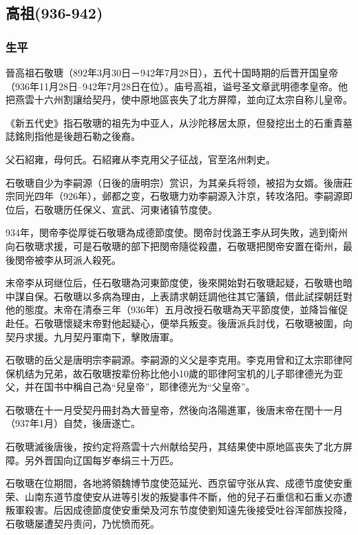 
\subsection{高祖\tiny(936-942)}

\subsubsection{生平}

晉高祖石敬瑭（892年3月30日－942年7月28日），五代十国時期的后晋开国皇帝（936年11月28日–942年7月28日在位）。庙号高祖，谥号圣文章武明德孝皇帝。他把燕雲十六州割讓给契丹，使中原地區丧失了北方屏障，並向辽太宗自称儿皇帝。

《新五代史》指石敬瑭的祖先为中亚人，从沙陀移居太原，但發挖出土的石重貴墓誌銘則指他是後趙石勒之後裔。

父石紹雍，母何氏。石紹雍从李克用父子征战，官至洺州刺史。

石敬瑭自少为李嗣源（日後的唐明宗）赏识，为其亲兵将领，被招为女婿。後唐莊宗同光四年（926年），邺都之变，石敬瑭力劝李嗣源入汴京，转攻洛阳。李嗣源即位后，石敬瑭历任保义、宣武、河東诸镇节度使。

934年，閔帝李從厚徙石敬瑭為成德節度使。閔帝討伐潞王李从珂失敗，逃到衛州向石敬瑭求援，可是石敬瑭的部下把閔帝隨從殺盡，石敬瑭把閔帝安置在衛州，最後閔帝被李从珂派人殺死。

末帝李从珂继位后，任石敬瑭為河東節度使，後來開始對石敬瑭起疑，石敬瑭也暗中謀自保。石敬瑭以多病為理由，上表請求朝廷調他往其它藩鎮，借此試探朝廷對他的態度。末帝在清泰三年（936年）五月改授石敬瑭為天平節度使，並降旨催促赴任。石敬瑭懷疑末帝對他起疑心，便举兵叛变。後唐派兵討伐，石敬瑭被圍，向契丹求援。九月契丹軍南下，擊敗唐軍。

石敬瑭的岳父是唐明宗李嗣源。李嗣源的义父是李克用。李克用曾和辽太宗耶律阿保机结为兄弟，故石敬瑭按辈份称比他小10歲的耶律阿宝机的儿子耶律德光为亚父，并在国书中稱自己為“兒皇帝”，耶律德光为“父皇帝”。

石敬瑭在十一月受契丹冊封為大晉皇帝，然後向洛陽進軍，後唐末帝在閏十一月（937年1月）自焚，後唐遂亡。

石敬瑭滅後唐後，按约定将燕雲十六州献给契丹，其结果使中原地區丧失了北方屏障。另外晋国向辽国每岁奉绢三十万匹。

石敬瑭在位期間，各地將領魏博节度使范延光、西京留守张从宾、成德节度使安重荣、山南东道节度使安从进等引发的叛變事件不斷，他的兒子石重信和石重乂亦遭叛軍殺害。后因成德節度使安重榮及河东节度使劉知遠先後接受吐谷浑部族投降，石敬瑭屡遭契丹责问，乃忧愤而死。

